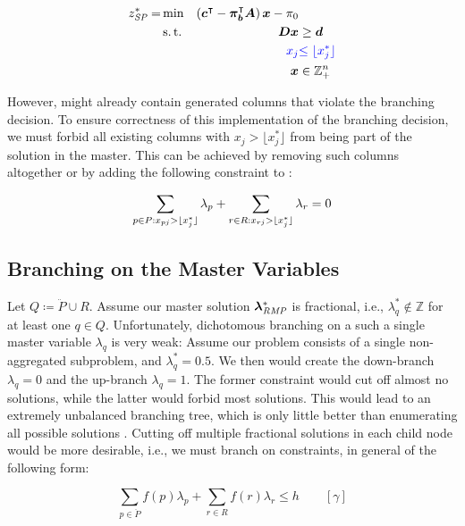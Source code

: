 \begin{equation}
\begin{aligned}
z^*_\SP{} = &\min & \left( \vec{c}\transpose - \vec{\pi}_\vec{b}\transpose \mat{A} \right) \vec{x} - \pi_0 & \\
&\st & \mat{D} \vec{x} & \geq \vec{d} \\
&& {\color{blue} x_j} & {\color{blue} \leq \floor{x_j^*}}\\
&& \vec{x} & \in \mathbb{Z}_+^n
\end{aligned}
\end{equation}

However, \RMP{} might already contain generated columns that violate the branching decision. To ensure correctness of this implementation of the branching decision, we must forbid all existing columns with $x_j > \lfloor x_j^* \rfloor$ from being part of the solution in the master. This can be achieved by removing such columns altogether or by adding the following constraint to \MP{}:

\begin{equation}
\sum_{p \in P: x_{pj} > \lfloor x_j^*\rfloor} \lambda_p + \sum_{r \in R: x_{rj} > \lfloor x_j^*\rfloor} \lambda_r = 0
\end{equation}

\subsection{Branching on the Master Variables}\label{sec:cg_bp_bp_branching_master}
Let $Q \coloneqq \ddot{P} \cup R$. Assume our master solution ${\bm{\lambda}}^*_{\textit{RMP}}{}$ is fractional, i.e., $\lambda_q^* \not\in \mathbb{Z}$ for at least one $q \in Q$. Unfortunately, dichotomous branching on a such a single master variable $\lambda_q$ is very weak: Assume our problem consists of a single non-aggregated subproblem, and $\lambda_q^* = 0.5$. We then would create the down-branch $\lambda_q = 0$ and the up-branch $\lambda_q = 1$. The former constraint would cut off almost no solutions, while the latter would forbid most solutions. This would lead to an extremely unbalanced branching tree, which is only little better than enumerating all possible solutions \cite{thebook}. Cutting off multiple fractional solutions in each child node would be more desirable, i.e., we must branch on constraints, in general of the following form:

\begin{equation*}
\sum_{p \in \ddot{P}} f(p) \lambda_p + \sum_{r \in R} f(r) \lambda_r \leq h \qquad \left[\gamma\right]
\end{equation*}

